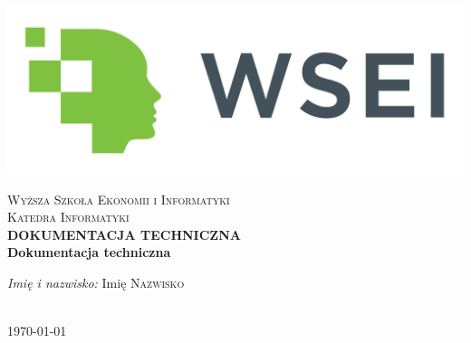 \begin{titlepage}

\begin{center}

\includegraphics[scale=0.08]{Images/logo_wsei.jpg}

\textsc{Wyższa Szkoła Ekonomii i Informatyki}\\[0.2cm]
\vspace{2cm}
\textsc{Katedra Informatyki}\\[1cm]

{\huge \bfseries DOKUMENTACJA TECHNICZNA}\\[1cm]

\textbf{Dokumentacja techniczna}\\[1cm]

\vfill

\begin{minipage}{0.8\textwidth}
\begin{flushleft}
{\large \emph{Imię i nazwisko:} } { \hfill Imię  \textsc{Nazwisko}} \newline
\end{flushleft}
\end{minipage}\\[2cm]

\large{\today}

\end{center}

\end{titlepage}
